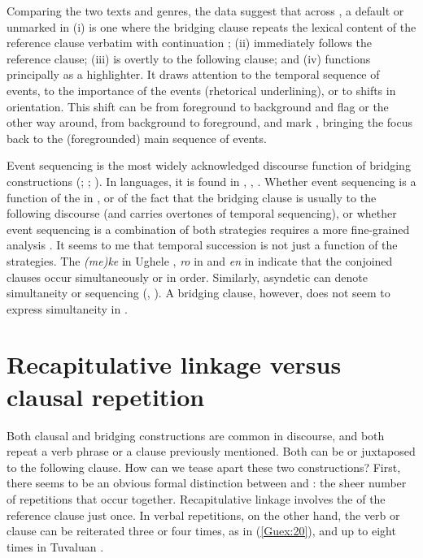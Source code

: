 \documentclass[output=paper]{LSP/langsci}
\begin{document}
Comparing the two texts and genres, the data suggest that across , a default or unmarked  in  (i) is one where the bridging clause repeats the lexical content of the reference clause verbatim with continuation ; (ii) immediately follows the reference clause; (iii) is overtly  to the following clause; and (iv) functions principally as a highlighter. It draws attention to the temporal sequence of events, to the importance of the events (rhetorical underlining), or to shifts in orientation. This shift can be from foreground to background and flag  or the other way around, from background to foreground, and mark , bringing the focus back to the (foregrounded) main sequence of events. 

Event sequencing is the most widely acknowledged discourse function of bridging constructions (\citealt[][130, 242, 261]{hasan76};  \citealt[][370]{devries.2005}; \citealt[][273]{Thompson.et.al.2007}). In  languages, it is found in  \citep[][259]{dimock09},  \citep[427]{hyslop01},  \citep[24--26]{Schneider09}. Whether event sequencing is a function of the  in , or of the fact that the bridging clause is usually  to the following discourse (and  carries overtones of temporal sequencing), or whether event sequencing is a combination of both strategies requires a more fine-grained analysis \citep[see also][325]{guerin11}. It seems to me that temporal succession is not just a function of the  strategies. The  \textit{(me)ke} in Ughele \citep[][242]{Frostad2012}, \textit{ro} in  \citep[][322]{guerin11} and \textit{en} in  \citep[][230--231]{dimock09} indicate that the conjoined clauses occur simultaneously or in  order. Similarly, asyndetic  can denote simultaneity or sequencing (\citealt[][241]{Frostad2012}, \citealt[][425--426]{hyslop01}). A bridging clause, however, does not seem to express simultaneity in . 


\section{Recapitulative linkage versus clausal repetition}
\label{Gurepetition}
Both clausal  and bridging constructions are common in  discourse, and both repeat a verb phrase or a clause previously mentioned. Both can be  or juxtaposed to the following clause. How can we tease apart these two constructions?  First, there seems to be an obvious formal distinction between  and : the sheer number of repetitions that occur together. Recapitulative linkage involves the  of the reference clause just once. In verbal repetitions, on the other hand, the verb or clause can be reiterated three or four times, as in (\ref{Guex:20}), and up to eight times in Tuvaluan \citep[][487]{besnier00}.
\end{document}
